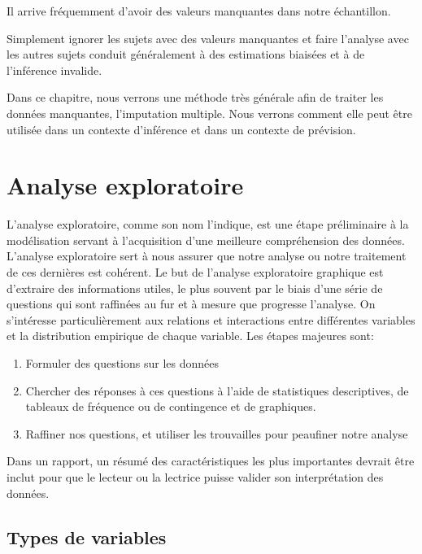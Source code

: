 \documentclass[
  11pt,
  letterpaper,
]{scrbook}
\providecommand{\tightlist}{%
  \setlength{\itemsep}{0pt}\setlength{\parskip}{0pt}}\usepackage{longtable,booktabs,array}
\theoremstyle{definition}
\theoremstyle{remark}
\begin{document}
Il arrive fréquemment d'avoir des valeurs manquantes dans notre
échantillon.

Simplement ignorer les sujets avec des valeurs manquantes et faire
l'analyse avec les autres sujets conduit généralement à des estimations
biaisées et à de l'inférence invalide.

Dans ce chapitre, nous verrons une méthode très générale afin de traiter
les données manquantes, l'imputation multiple. Nous verrons comment elle
peut être utilisée dans un contexte d'inférence et dans un contexte de
prévision.


\hypertarget{analyse-exploratoire}{%
\chapter{Analyse exploratoire}\label{analyse-exploratoire}}

L'analyse exploratoire, comme son nom l'indique, est une étape
préliminaire à la modélisation servant à l'acquisition d'une meilleure
compréhension des données. L'analyse exploratoire sert à nous assurer
que notre analyse ou notre traitement de ces dernières est cohérent. Le
but de l'analyse exploratoire graphique est d'extraire des informations
utiles, le plus souvent par le biais d'une série de questions qui sont
raffinées au fur et à mesure que progresse l'analyse. On s'intéresse
particulièrement aux relations et interactions entre différentes
variables et la distribution empirique de chaque variable. Les étapes
majeures sont:

\begin{enumerate}
\def\labelenumi{\arabic{enumi}.}
\tightlist
\item
  Formuler des questions sur les données
\item
  Chercher des réponses à ces questions à l'aide de statistiques
  descriptives, de tableaux de fréquence ou de contingence et de
  graphiques.
\item
  Raffiner nos questions, et utiliser les trouvailles pour peaufiner
  notre analyse
\end{enumerate}

Dans un rapport, un résumé des caractéristiques les plus importantes
devrait être inclut pour que le lecteur ou la lectrice puisse valider
son interprétation des données.

\hypertarget{types-de-variables}{%
\section{Types de variables}\label{types-de-variables}}
\end{document}
